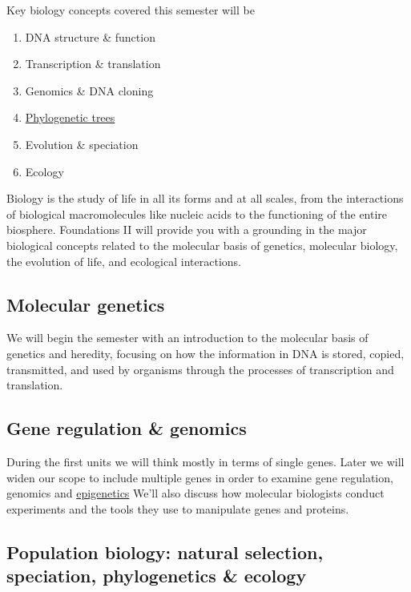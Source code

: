 \documentclass[
]{book}
\providecommand{\tightlist}{%
  \setlength{\itemsep}{0pt}\setlength{\parskip}{0pt}}
\begin{document}
Key biology concepts covered this semester will be

\begin{enumerate}
\def\labelenumi{\arabic{enumi}.}
\tightlist
\item
  DNA structure \& function
\item
  Transcription \& translation
\item
  Genomics \& DNA cloning
\item
  \href{https://en.wikipedia.org/wiki/Phylogenetic_tree}{Phylogenetic trees}
\item
  Evolution \& speciation
\item
  Ecology
\end{enumerate}

Biology is the study of life in all its forms and at all scales, from the interactions of biological macromolecules like nucleic acids to the functioning of the entire biosphere. Foundations II will provide you with a grounding in the major biological concepts related to the molecular basis of genetics, molecular biology, the evolution of life, and ecological interactions.

\hypertarget{molecular-genetics}{%
\subsection{Molecular genetics}\label{molecular-genetics}}

We will begin the semester with an introduction to the molecular basis of genetics and heredity, focusing on how the information in DNA is stored, copied, transmitted, and used by organisms through the processes of transcription and translation.

\hypertarget{gene-regulation-genomics}{%
\subsection{Gene regulation \& genomics}\label{gene-regulation-genomics}}

During the first units we will think mostly in terms of single genes. Later we will widen our scope to include multiple genes in order to examine gene regulation, genomics and \href{https://en.wikipedia.org/wiki/Epigenetics}{epigenetics} We'll also discuss how molecular biologists conduct experiments and the tools they use to manipulate genes and proteins.

\hypertarget{population-biology-natural-selection-speciation-phylogenetics-ecology}{%
\subsection{Population biology: natural selection, speciation, phylogenetics \& ecology}\label{population-biology-natural-selection-speciation-phylogenetics-ecology}}
\end{document}
